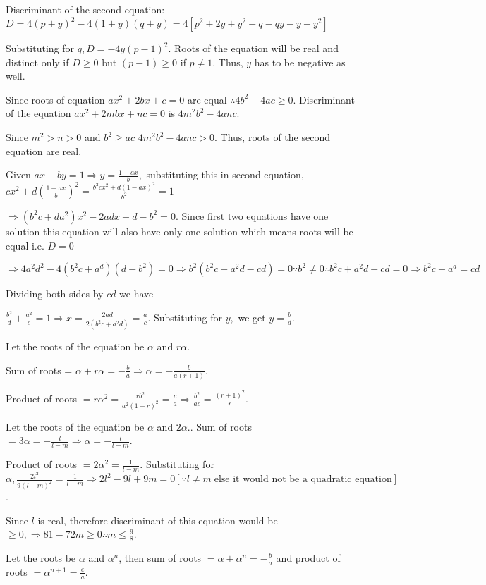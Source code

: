   Discriminant of the second equation: $D = 4(p + y)^2 - 4(1 + y)(q + y) = 4[p^2 + 2y + y^2 - q -qy -y - y^2]$

  Substituting for $q, D = -4y(p - 1)^2$. Roots of the equation will be real and distinct only if $D \geq
  0$ but $(p - 1) \geq 0$ if $p \neq 1$. Thus, $y$ has to be negative as well.
\item Since roots of equation $ax^2 + 2bx + c = 0$ are equal $\therefore 4b^2 - 4ac \geq 0$. Discriminant of
  the equation $ax^2 + 2mbx + nc = 0$ is $4m^2b^2 - 4anc$.

  Since $m^2 > n > 0$ and $b^2 \geq ac$ $4m^2b^2 - 4anc > 0$. Thus, roots of the second equation are real.
\item Given $ax + by = 1 \Rightarrow y = \frac{1 - ax}{b},$ substituting this in second equation, $cx^2 +
  d\left(\frac{1 - ax}{b}\right)^2 = \frac{b^2cx^2 + d(1 - ax)^2}{b^2} = 1$

  $\Rightarrow (b^2c + da^2)x^2 - 2adx + d - b^2 = 0$. Since first two equations have one solution this
  equation will also have only one solution which means roots will be equal i.e. $D = 0$

  $\Rightarrow 4a^2d^2 - 4(b^2c + a^d)(d - b^2) = 0\Rightarrow b^2(b^2c + a^2d - cd) = 0\because b^2 \ne 0
  \therefore b^2c + a^2d - cd = 0 \Rightarrow b^2c + a^d = cd$

  Dividing both sides by $cd$ we have

  $\frac{b^2}{d} + \frac{a^2}{c} = 1\Rightarrow x = \frac{2ad}{2(b^2c + a^2d)} = \frac{a}{c}$. Substituting
  for $y,$ we get $y = \frac{b}{d}$.
\item Let the roots of the equation be $\alpha$ and $r\alpha$.

  Sum of roots = $\alpha + r\alpha = -\frac{b}{a} \Rightarrow \alpha = -\frac{b}{a(r + 1)}$.

  Product of roots $= r\alpha^2 = \frac{rb^2}{a^2(1 + r)^2} = \frac{c}{a} \Rightarrow \frac{b^2}{ac} =
  \frac{(r + 1)^2}{r}$.
\item Let the roots of the equation be $\alpha$ and $2\alpha.$. Sum of roots $= 3\alpha = -\frac{l}{l - m}
  \Rightarrow \alpha = -\frac{l}{l - m}$.

  Product of roots $= 2\alpha^2 = \frac{1}{l - m}$. Substituting for $\alpha, \frac{2l^2}{9(l - m)^2} =
  \frac{1}{l - m} \Rightarrow 2l^2- 9l + 9m = 0 [\because l\neq m\;\text{else it would not be a quadratic
      equation}]$.

  Since $l$ is real, therefore discriminant of this equation would be $\geq 0, \Rightarrow 81 - 72m \geq 0
  \therefore m \leq \frac{9}{8}$.
\item Let the roots be $\alpha$ and $\alpha^n$, then sum of roots $= \alpha + \alpha^n = -\frac{b}{a}$ and
  product of roots $= \alpha^{n + 1} = \frac{c}{a}$.

